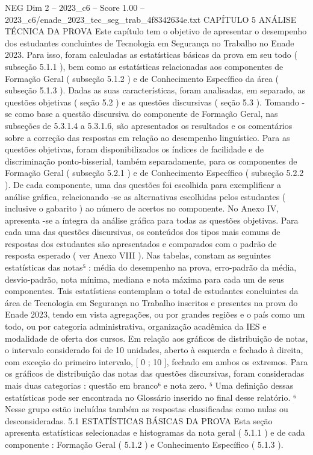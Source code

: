 \begin{textsample}{NEG Dim 2 – 2023\_c6 – Score 1.00 – 2023\_c6/enade\_2023\_tec\_seg\_trab\_4f8342634e.txt}  \label{ex:f2_neg_267}
CAPÍTULO 5 ANÁLISE TÉCNICA DA PROVA Este capítulo tem o objetivo de apresentar o desempenho dos estudantes concluintes de Tecnologia em Segurança no Trabalho no Enade 2023.
Para isso, foram calculadas as estatísticas básicas da prova em seu todo ( subseção 5.1.1 ), bem como as estatísticas relacionadas aos componentes de Formação Geral ( subseção 5.1.2 ) e de Conhecimento Específico da área ( subseção 5.1.3 ).
Dadas as suas características, foram analisadas, em separado, as questões objetivas ( seção 5.2 ) e as questões discursivas ( seção 5.3 ).
Tomando -se como base a questão discursiva do componente de Formação Geral, nas subseções de 5.3.1.4 a 5.3.1.6, são apresentados os resultados e os comentários sobre a correção das respostas em relação ao desempenho linguístico.
Para as questões objetivas, foram disponibilizados os índices de facilidade e de discriminação ponto-bisserial, também separadamente, para os componentes de Formação Geral ( subseção 5.2.1 ) e de Conhecimento Específico ( subseção 5.2.2 ).
De cada componente, uma das questões foi escolhida para exemplificar a análise gráfica, relacionando -se as alternativas escolhidas pelos estudantes ( inclusive o gabarito ) ao número de acertos no componente.
No Anexo IV, apresenta -se a íntegra da análise gráfica para todas as questões objetivas.
Para cada uma das questões discursivas, os conteúdos dos tipos mais comuns de respostas dos estudantes são apresentados e comparados com o padrão de resposta esperado ( ver Anexo VIII ).
Nas tabelas, constam as seguintes estatísticas das notas⁵ : média do desempenho na prova, erro-padrão da média, desvio-padrão, nota mínima, mediana e nota máxima para cada um de seus componentes.
Tais estatísticas contemplam o total de estudantes concluintes da área de Tecnologia em Segurança no Trabalho inscritos e presentes na prova do Enade 2023, tendo em vista agregações, ou por grandes regiões e o país como um todo, ou por categoria administrativa, organização acadêmica da IES e modalidade de oferta dos cursos.
Em relação aos gráficos de distribuição de notas, o intervalo considerado foi de 10 unidades, aberto à esquerda e fechado à direita, com exceção do primeiro intervalo, [ 0 ; 10 ], fechado em ambos os extremos.
Para os gráficos de distribuição das notas das questões discursivas, foram consideradas mais duas categorias : questão em branco⁶ e nota zero. ⁵ Uma definição dessas estatísticas pode ser encontrada no Glossário inserido no final desse relatório. ⁶ Nesse grupo estão incluídas também as respostas classificadas como nulas ou desconsideradas. 5.1 ESTATÍSTICAS BÁSICAS DA PROVA Esta seção apresenta estatísticas selecionadas e histogramas da nota geral ( 5.1.1 ) e de cada componente : Formação Geral ( 5.1.2 ) e Conhecimento Específico ( 5.1.3 ).

\end{textsample}
